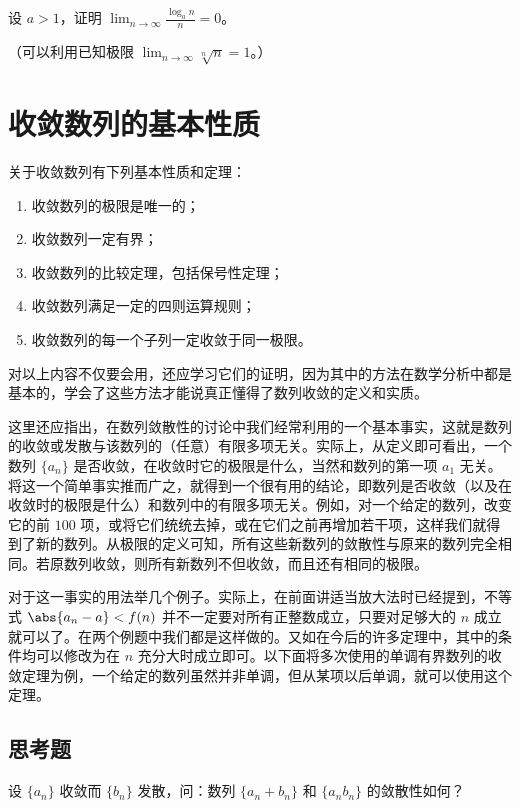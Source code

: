 \begin{xexercise}[5]
设 $a>1$，证明 $\displaystyle\lim_{n\to\infty}\frac{\log_a n}{n}=0$。

  （可以利用已知极限 $\displaystyle\lim_{n\to\infty}\sqrt[n]{n}=1$。）
\end{xexercise}

\section{收敛数列的基本性质}

关于收敛数列有下列基本性质和定理：
\begin{enumerate}[label=\arabic*.]
  \item 收敛数列的极限是唯一的；
  \item 收敛数列一定有界；
  \item 收敛数列的比较定理，包括保号性定理；
  \item 收敛数列满足一定的四则运算规则；
  \item 收敛数列的每一个子列一定收敛于同一极限。
\end{enumerate}

对以上内容不仅要会用，还应学习它们的证明，因为其中的方法在数学分析中都是基本的，学会了这些方法才能说真正懂得了数列收敛的定义和实质。

这里还应指出，在数列敛散性的讨论中我们经常利用的一个基本事实，这就是数列的收敛或发散与该数列的（任意）有限多项无关。实际上，从定义即可看出，一个数列 $\{a_n\}$ 是否收敛，在收敛时它的极限是什么，当然和数列的第一项 $a_1$ 无关。将这一个简单事实推而广之，就得到一个很有用的结论，即数列是否收敛（以及在收敛时的极限是什么）和数列中的有限多项无关。例如，对一个给定的数列，改变它的前 $100$ 项，或将它们统统去掉，或在它们之前再增加若干项，这样我们就得到了新的数列。从极限的定义可知，所有这些新数列的敛散性与原来的数列完全相同。若原数列收敛，则所有新数列不但收敛，而且还有相同的极限。

对于这一事实的用法举几个例子。实际上，在前面讲适当放大法时已经提到，不等式 $\abs{a_n-a}<f(n)$ 并不一定要对所有正整数成立，只要对足够大的 $n$ 成立就可以了。在两个例题中我们都是这样做的。又如在今后的许多定理中，其中的条件均可以修改为在 $n$ 充分大时成立即可。以下面将多次使用的单调有界数列的收敛定理为例，一个给定的数列虽然并非单调，但从某项以后单调，就可以使用这个定理。

\subsection{思考题}

\begin{xthought}[1]
设 $\{a_n\}$ 收敛而 $\{b_n\}$ 发散，问：数列 $\{a_n+b_n\}$ 和 $\{a_nb_n\}$ 的敛散性如何？
\end{xthought}

